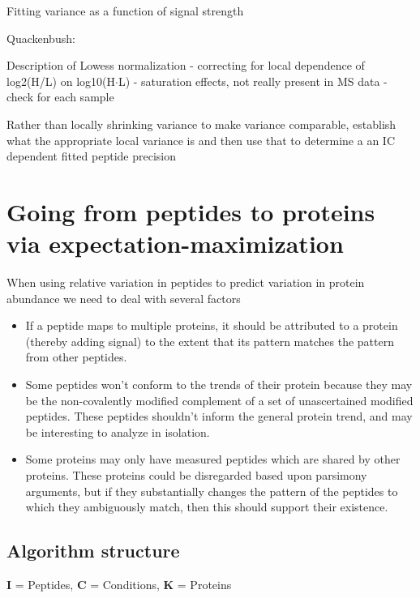 \documentclass[12pt]{article}
\begin{document}
Fitting variance as a function of signal strength

Quackenbush:

Description of Lowess normalization - correcting for local dependence of log2(H/L) on log10(H$\cdot$L) - saturation effects, not really present in MS data - check for each sample

Rather than locally shrinking variance to make variance comparable, establish what the appropriate local variance is and then use that to determine a an IC dependent fitted peptide precision



\section*{Going from peptides to proteins via expectation-maximization}

When using relative variation in peptides to predict variation in protein abundance we need to deal with several factors
\begin{itemize}
\item If a peptide maps to multiple proteins, it should be attributed to a protein (thereby adding signal) to the extent that its pattern matches the pattern from other peptides.
\item Some peptides won't conform to the trends of their protein because they may be the non-covalently modified complement of a set of unascertained modified peptides. These peptides shouldn't inform the general protein trend, and may be interesting to analyze in isolation.
\item Some proteins may only have measured peptides which are shared by other proteins. These proteins could be disregarded based upon parsimony arguments, but if they substantially changes the pattern of the peptides to which they ambiguously match, then this should support their existence.
\end{itemize}

\subsection*{Algorithm structure}

\textbf{I} = Peptides, \textbf{C} = Conditions, \textbf{K} = Proteins
\end{document}

